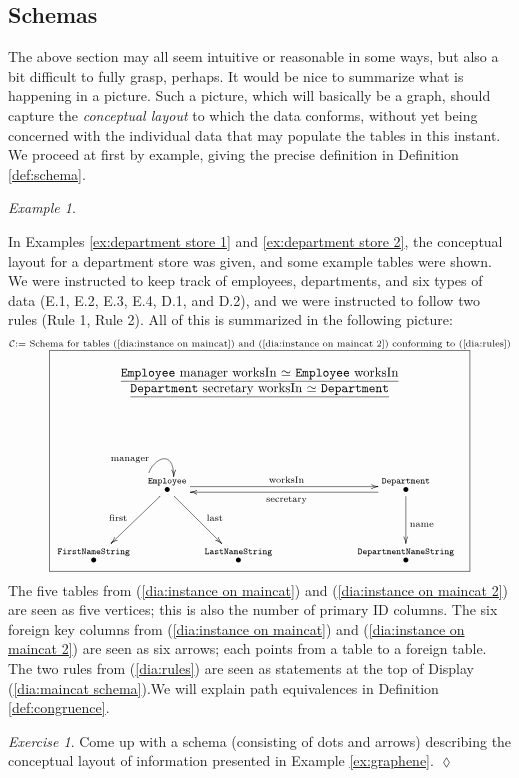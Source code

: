 \documentclass{book}
\makeatletter
\def\tn{\textnormal}
\def\mc{\mathcal}
\def\hsp{\hspace{.3in}}
\newcommand{\LTO}[1]{\stackrel{\tt{#1}}{\bullet}}
\def\mcC{\mc{C}}
\theoremstyle{remark}
\newtheorem{example}[subsubsection]{Example}
\newtheorem{exc}[subsubsection]{Exercise}
\newenvironment{exercise}{\begin{exc}}{\hspace*{\fill}$\lozenge$\end{exc}}
\theoremstyle{definition}
\newcommand{\MainCatLarge}[1]{ 
	\stackrel{#1}{
		\parbox{4.5in}{\fbox{\parbox{4.4in}{\begin{center}\underline{{\tt Employee} manager worksIn $\simeq$ {\tt Employee} worksIn}\hsp  \underline{{\tt Department} secretary worksIn $\simeq$ {\tt Department}}\end{center}~\\\\\\
			\xymatrix@=8pt{&\LTO{Employee}\ar@<.5ex>[rrrrr]^{\tn{worksIn}}\ar@(l,u)[]+<5pt,10pt>^{\tn{manager}}\ar[dddl]_{\tn{first}}\ar[dddr]^{\tn{last}}&&&&&\LTO{Department}\ar@<.5ex>[lllll]^{\tn{secretary}}\ar[ddd]^{\tn{name}}\\\\\\\LTO{FirstNameString}&&\LTO{LastNameString}&~&~&~&\LTO{DepartmentNameString}
			}
		}}}
	}
}
\makeatother
\begin{document}

\subsection{Schemas}\label{sec:schemas}

The above section may all seem intuitive or reasonable in some ways, but also a bit difficult to fully grasp, perhaps. It would be nice to summarize what is happening in a picture. Such a picture, which will basically be a graph, should capture the {\em conceptual layout} to which the data conforms, without yet being concerned with the individual data that may populate the tables in this instant. We proceed at first by example, giving the precise definition in Definition \ref{def:schema}.

\begin{example}\label{ex:department store 3}

In Examples \ref{ex:department store 1} and \ref{ex:department store 2}, the conceptual layout for a department store was given, and some example tables were shown. We were instructed to keep track of employees, departments, and six types of data (E.1, E.2, E.3, E.4, D.1, and D.2), and we were instructed to follow two rules (Rule 1, Rule 2). All of this is summarized in the following picture:
\begin{align}\label{dia:maincat schema}
\MainCatLarge{\mcC:=\tn{ Schema for tables (\ref{dia:instance on maincat}) and (\ref{dia:instance on maincat 2}) conforming to (\ref{dia:rules})}}
\end{align}
The five tables from (\ref{dia:instance on maincat}) and (\ref{dia:instance on maincat 2}) are seen as five vertices; this is also the number of primary ID columns. The six foreign key columns from (\ref{dia:instance on maincat}) and (\ref{dia:instance on maincat 2}) are seen as six arrows; each points from a table to a foreign table. The two rules from (\ref{dia:rules}) are seen as statements at the top of Display (\ref{dia:maincat schema}).We will explain path equivalences in Definition \ref{def:congruence}.

\end{example}

\begin{exercise}\label{exc:schema for first tables}
Come up with a schema (consisting of dots and arrows) describing the conceptual layout of information presented in Example \ref{ex:graphene}. 
\end{exercise}
\end{document}
